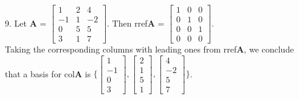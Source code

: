 \documentclass{article}
\begin{document}
    9. Let \textbf{A} = $\begin{bmatrix} 1 & 2 & 4\\ -1 & 1 & -2\\ 0 & 5 & 5\\ 3 & 1 & 7\end{bmatrix}$. Then rref\textbf{A} = $\begin{bmatrix} 1 & 0 & 0\\ 0 & 1 & 0\\ 0 & 0 & 1\\ 0 & 0 & 0\end{bmatrix}$. \\
    Taking the corresponding columns with leading ones from rref\textbf{A}, we conclude that a basis for col\textbf{A} is $\Biggl\{\begin{bmatrix} 1 \\ -1 \\ 0 \\ 3\end{bmatrix}, \begin{bmatrix} 2 \\ 1 \\ 5 \\ 1\end{bmatrix}, \begin{bmatrix} 4 \\ -2 \\ 5 \\ 7\end{bmatrix}\Biggl\}$. \\
    \\
\end{document}

